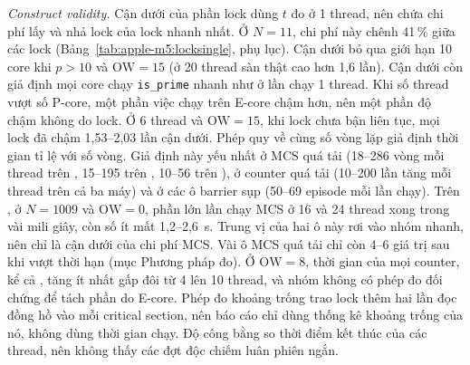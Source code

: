 
\emph{Construct validity.} Cận dưới của phần lock dùng $t$ đo ở 1 thread, nên chứa chi phí lấy và nhả
lock của lock nhanh nhất. Ở $N=11$, chi phí này chênh 41\,\% giữa các lock
(Bảng~\ref{tab:apple-m5:locksingle}, phụ lục). Cận dưới bỏ qua giới hạn 10 core khi $p > 10$ và
$\mathrm{OW} = 15$ (ở 20 thread sàn thật cao hơn 1,6 lần). Cận dưới còn giả định mọi core chạy
\texttt{is\_prime} nhanh như ở lần chạy 1 thread. Khi số thread vượt số P-core, một phần việc chạy trên
E-core chậm hơn, nên một phần độ chậm không do lock. Ở 6 thread và $\mathrm{OW} = 15$, khi lock chưa
bận liên tục, mọi lock đã chậm 1,53--2,03 lần cận dưới.
Phép quy về cùng số vòng lặp giả định thời gian tỉ lệ với số vòng. Giả định này yếu nhất ở MCS quá tải
(18--286 vòng mỗi thread trên , 15--195 trên , 10--56 trên
), ở counter  quá tải (10--200 lần tăng mỗi thread trên cả ba máy) và
ở các ô barrier sụp (50--69 episode mỗi lần chạy). Trên , ở $N=1009$ và
$\mathrm{OW}=0$, phần lớn lần chạy MCS ở 16 và 24 thread xong trong vài mili giây, còn số ít mất 1,2--2,6~s.
Trung vị của hai ô này rơi vào nhóm nhanh, nên chỉ là cận dưới của chi phí MCS. Vài ô MCS quá tải chỉ
còn 4--6 giá trị sau khi vượt thời hạn (mục Phương pháp đo).
Ở $\mathrm{OW}=8$, thời gian của mọi counter, kể cả , tăng ít nhất gấp đôi từ 4 lên 10 thread,
và nhóm không có phép đo đối chứng để tách phần do E-core. Phép đo khoảng trống trao lock thêm hai lần
đọc đồng hồ vào mỗi critical section, nên báo cáo chỉ dùng thống kê khoảng trống của nó, không dùng thời
gian chạy. Độ công bằng so thời điểm kết thúc của các thread, nên không thấy các đợt độc chiếm luân phiên
ngắn.

